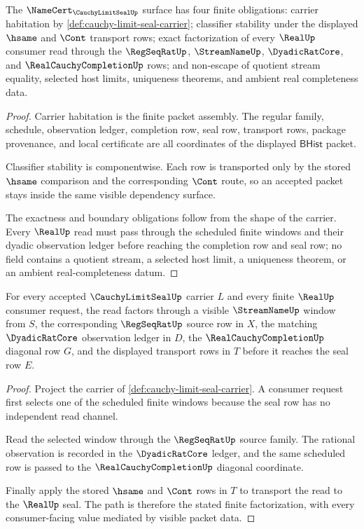 \begin{theorem}
\label{thm:cauchy-limit-seal-namecert-obligations}
The $\NameCert_{\CauchyLimitSealUp}$ surface has four finite obligations: carrier habitation by \autoref{def:cauchy-limit-seal-carrier}; classifier stability under the displayed $\hsame$ and $\Cont$ transport rows; exact factorization of every $\RealUp$ consumer read through the $\RegSeqRatUp$, $\StreamNameUp$, $\DyadicRatCore$, and $\RealCauchyCompletionUp$ rows; and non-escape of quotient stream equality, selected host limits, uniqueness theorems, and ambient real completeness data.
\end{theorem}
\begin{proof}
Carrier habitation is the finite packet assembly. The regular family, schedule, observation ledger, completion row, seal row, transport rows, package provenance, and local certificate are all coordinates of the displayed $\mathsf{BHist}$ packet.

Classifier stability is componentwise. Each row is transported only by the stored $\hsame$ comparison and the corresponding $\Cont$ route, so an accepted packet stays inside the same visible dependency surface.

The exactness and boundary obligations follow from the shape of the carrier. Every $\RealUp$ read must pass through the scheduled finite windows and their dyadic observation ledger before reaching the completion row and seal row; no field contains a quotient stream, a selected host limit, a uniqueness theorem, or an ambient real-completeness datum.
\end{proof}

\begin{theorem}
\label{thm:cauchy-limit-seal-window-factorization}
For every accepted $\CauchyLimitSealUp$ carrier $L$ and every finite $\RealUp$ consumer request, the read factors through a visible $\StreamNameUp$ window from $S$, the corresponding $\RegSeqRatUp$ source row in $X$, the matching $\DyadicRatCore$ observation ledger in $D$, the $\RealCauchyCompletionUp$ diagonal row $G$, and the displayed transport rows in $T$ before it reaches the seal row $E$.
\end{theorem}
\begin{proof}
Project the carrier of \autoref{def:cauchy-limit-seal-carrier}. A consumer request first selects one of the scheduled finite windows because the seal row has no independent read channel.

Read the selected window through the $\RegSeqRatUp$ source family. The rational observation is recorded in the $\DyadicRatCore$ ledger, and the same scheduled row is passed to the $\RealCauchyCompletionUp$ diagonal coordinate.

Finally apply the stored $\hsame$ and $\Cont$ rows in $T$ to transport the read to the $\RealUp$ seal. The path is therefore the stated finite factorization, with every consumer-facing value mediated by visible packet data.
\end{proof}

